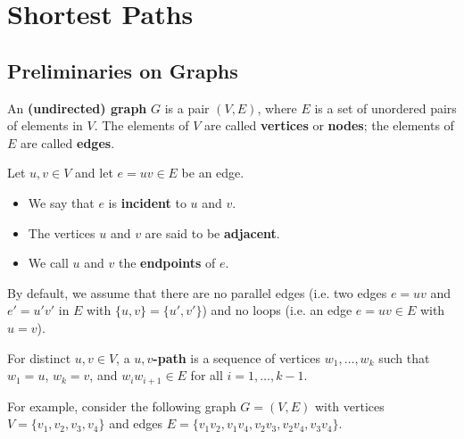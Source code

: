 \section{Shortest Paths}\label{sec:1}

\subsection{Preliminaries on Graphs}\label{subsec:1.1}
An {\bf (undirected) graph} $G$ is a pair $(V, E)$, where $E$ is a set of 
unordered pairs of elements in $V$. The elements of $V$ are called {\bf vertices}
or {\bf nodes}; the elements of $E$ are called {\bf edges}. 

Let $u, v \in V$ and let $e = uv \in E$ be an edge. 
\begin{itemize}
    \item We say that $e$ is {\bf incident} to $u$ and $v$. 
    \item The vertices $u$ and $v$ are said to be {\bf adjacent}.
    \item We call $u$ and $v$ the {\bf endpoints} of $e$. 
\end{itemize}
By default, we assume that there are no parallel edges (i.e. two
edges $e = uv$ and $e' = u'v'$ in $E$ with $\{u, v\} = \{u', v'\}$) 
and no loops (i.e. an edge $e = uv \in E$ with $u = v$).

For distinct $u, v \in V$, a {\bf $u, v$-path} is a sequence of vertices 
$w_1, \dots, w_k$ such that $w_1 = u$, $w_k = v$, and $w_i w_{i+1} \in E$ 
for all $i = 1, \dots, k-1$.  

For example, consider the following graph $G = (V, E)$ with 
vertices $V = \{v_1, v_2, v_3, v_4\}$ and edges $E = \{v_1v_2, v_1v_4, v_2v_3, 
v_2v_4, v_3v_4\}$. 

\begin{center}
\end{center}
\vspace{-0.5cm}

